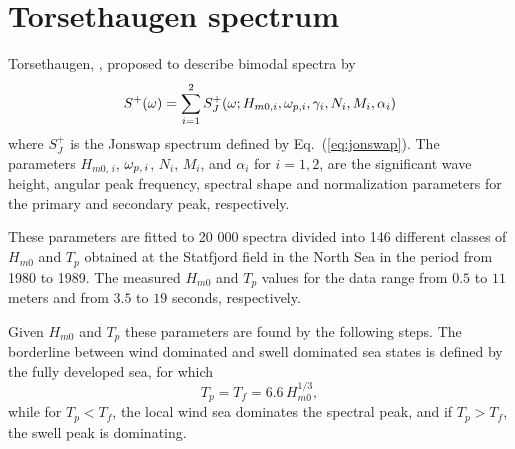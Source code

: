 \section{Torsethaugen spectrum}
\label{sec:torsethaugen}
Torsethaugen,
\cite{Torsethaugen1993Two,Torsethaugen1994Model,Torsethaugen1996Model},
proposed to
describe bimodal spectra by
\begin{gather}
 S^{+}(\omega ) = \sum_{i=1}^{2} S_{J}^{+}(\omega ;H_{m0,i},\omega _{p,i},\gamma_{i},N_{i},M_{i},\alpha_{i})
\end{gather}
where $S_{J}^{+}$ is the {\sc Jonswap} spectrum defined by
Eq.~(\ref{eq:jonswap}). The parameters
$H_{m0,\,i}$, $\omega _{p,\,i}$, $N_{i}$, $M_{i}$,
and $\alpha_{i}$ for $i=1,2$, are the
significant wave height, angular peak frequency,
spectral shape and normalization
parameters for the primary and secondary peak, respectively.

 These parameters are fitted to
20 000 spectra divided into 146 different classes of $H_{m0}$ and
$T_{p}$ obtained
at the  Statfjord field in the North Sea in the period from 1980 to 1989.
 The  measured  $H_{m0}$ and $T_{p}$ values for the data
 range from $0.5$ to $11$ meters and from $3.5$ to $19$ seconds, respectively.

Given $H_{m0}$ and $T_{p}$ these parameters are found by the following steps.
The borderline between wind dominated and swell dominated sea states
is defined by the fully developed sea, for which
\begin{equation}
T_{p} = T_{f} = 6.6 \, H_{m0}^{1/3},
\end{equation}
while for $T_{p} < T_{f}$, the local wind sea dominates the spectral peak,
and if $T_{p} > T_{f}$, the swell peak is dominating.

